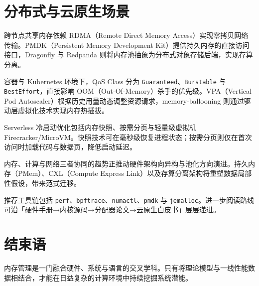 \chapter{分布式与云原生场景}
跨节点共享内存依赖 RDMA（Remote Direct Memory Access）实现零拷贝网络传输。PMDK（Persistent Memory Development Kit）提供持久内存的直接访问接口，Dragonfly 与 Redpanda 则将内存池抽象为分布式对象存储后端，实现存算分离。\par
容器与 Kubernetes 环境下，QoS Class 分为 \texttt{Guaranteed}、\texttt{Burstable} 与 \texttt{BestEffort}，直接影响 OOM（Out-Of-Memory）杀手的优先级。VPA（Vertical Pod Autoscaler）根据历史用量动态调整资源请求，memory-ballooning 则通过驱动层虚拟化技术实现内存热插拔。\par
Serverless 冷启动优化包括内存快照、按需分页与轻量级虚拟机 Firecracker/MicroVM。快照技术可在毫秒级恢复进程状态；按需分页则仅在首次访问时加载代码与数据页，降低启动延迟。\par
内存、计算与网络三者协同的趋势正推动硬件架构向异构与池化方向演进。持久内存（PMem）、CXL（Compute Express Link）以及存算分离架构将重塑数据局部性假设，带来范式迁移。\par
推荐工具链包括 \texttt{perf}、\texttt{bpftrace}、\texttt{numactl}、\texttt{pmdk} 与 \texttt{jemalloc}。进一步阅读路线可沿「硬件手册→内核源码→分配器论文→云原生白皮书」层层递进。\par
\chapter{结束语}
内存管理是一门融合硬件、系统与语言的交叉学科。只有将理论模型与一线性能数据相结合，才能在日益复杂的计算环境中持续挖掘系统潜能。\par
